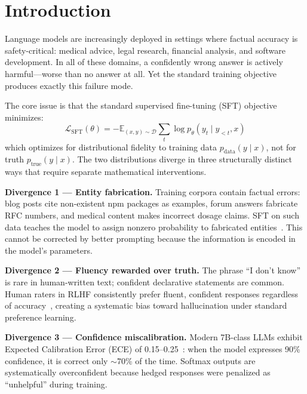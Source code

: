 \documentclass[11pt]{article}
\begin{document}
\section{Introduction}
\label{sec:intro}

Language models are increasingly deployed in settings where factual accuracy is safety-critical: medical advice, legal research, financial analysis, and software development. In all of these domains, a confidently wrong answer is actively harmful---worse than no answer at all. Yet the standard training objective produces exactly this failure mode.

The core issue is that the standard supervised fine-tuning (SFT) objective minimizes:
\begin{equation}
\mathcal{L}_{\text{SFT}}(\theta) = -\mathbb{E}_{(x,y) \sim \mathcal{D}} \sum_t \log p_\theta(y_t \mid y_{<t}, x)
\label{eq:sft}
\end{equation}
which optimizes for distributional fidelity to training data $p_{\text{data}}(y \mid x)$, not for truth $p_{\text{true}}(y \mid x)$. The two distributions diverge in three structurally distinct ways that require separate mathematical interventions.

\textbf{Divergence 1 — Entity fabrication.} Training corpora contain factual errors: blog posts cite non-existent npm packages as examples, forum answers fabricate RFC numbers, and medical content makes incorrect dosage claims. SFT on such data teaches the model to assign nonzero probability to fabricated entities~\cite{lewis2020rag}. This cannot be corrected by better prompting because the information is encoded in the model's parameters.

\textbf{Divergence 2 — Fluency rewarded over truth.} The phrase ``I don't know'' is rare in human-written text; confident declarative statements are common. Human raters in RLHF consistently prefer fluent, confident responses regardless of accuracy~\cite{lin2022truthfulqa}, creating a systematic bias toward hallucination under standard preference learning.

\textbf{Divergence 3 — Confidence miscalibration.} Modern 7B-class LLMs exhibit Expected Calibration Error (ECE) of 0.15--0.25~\cite{guo2017calibration}: when the model expresses 90\% confidence, it is correct only $\sim$70\% of the time. Softmax outputs are systematically overconfident because hedged responses were penalized as ``unhelpful'' during training.
\end{document}

